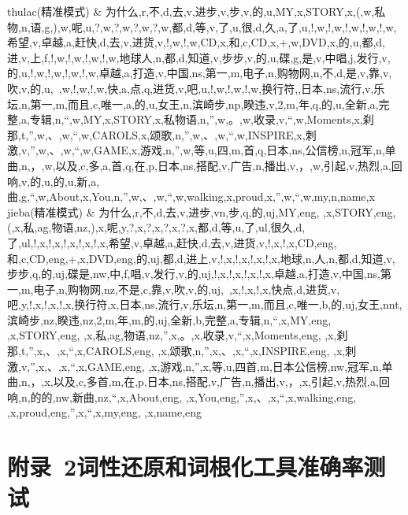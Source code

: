 \begin{center}
\begin{longtabu}
thulac\newline (精准模式) & 为什么,r,不,d,去,v,进步,v,步,v,的,u,MY,x,STORY,x,(,w,私物,n,语,g,),w,呢,u,?,w,?,w,?,w,?,w,都,d,等,v,了,u,很,d,久,a,了,u,!,w,!,w,!,w,!,w,!,w,希望,v,卓越,a,赶快,d,去,v,进货,v,!,w,!,w,CD,x,和,c,CD,x,+,w,DVD,x,的,u,都,d,进,v,上,f,!,w,!,w,!,w,!,w,地球人,n,都,d,知道,v,步步,v,的,u,碟,g,是,v,中唱,j,发行,v,的,u,!,w,!,w,!,w,!,w,卓越,a,打造,v,中国,ns,第一,m,电子,n,购物网,n,不,d,是,v,靠,v,吹,v,的,u,~,w,!,w,!,w,快,a,点,q,进货,v,吧,u,!,w,!,w,!,w,换行符,,日本,ns,流行,v,乐坛,n,第一,m,而且,c,唯一,a,的,u,女王,n,滨崎步,np,睽违,v,2,m,年,q,的,u,全新,a,完整,a,专辑,n,“,w,MY,x,STORY,x,私物语,n,”,w,。,w,收录,v,“,w,Moments,x,刹那,t,”,w,、,w,“,w,CAROLS,x,颂歌,n,”,w,、,w,“,w,INSPIRE,x,刺激,v,”,w,、,w,“,w,GAME,x,游戏,n,”,w,等,u,四,m,首,q,日本,ns,公信榜,n,冠军,n,单曲,n,，,w,以及,c,多,a,首,q,在,p,日本,ns,搭配,v,广告,n,播出,v,，,w,引起,v,热烈,a,回响,v,的,u,的,u,新,a,曲,g,“,w,About,x,You,n,”,w,、,w,“,w,walking,x,proud,x,”,w,“,w,my,n,name,x\\
jieba\newline (精准模式) & 为什么,r,不,d,去,v,进步,vn,步,q,的,uj,MY,eng, ,x,STORY,eng,(,x,私,ag,物语,nz,),x,呢,y,?,x,?,x,?,x,?,x,都,d,等,u,了,ul,很久,d,了,ul,!,x,!,x,!,x,!,x,!,x,希望,v,卓越,a,赶快,d,去,v,进货,v,!,x,!,x,CD,eng,和,c,CD,eng,+,x,DVD,eng,的,uj,都,d,进上,v,!,x,!,x,!,x,!,x,地球,n,人,n,都,d,知道,v,步步,q,的,uj,碟是,nw,中,f,唱,v,发行,v,的,uj,!,x,!,x,!,x,!,x,卓越,a,打造,v,中国,ns,第一,m,电子,n,购物网,nz,不是,c,靠,v,吹,v,的,uj,~,x,!,x,!,x,快点,d,进货,v,吧,y,!,x,!,x,!,x,换行符,x,日本,ns,流行,v,乐坛,n,第一,m,而且,c,唯一,b,的,uj,女王,nnt,滨崎步,nz,睽违,nz,2,m,年,m,的,uj,全新,b,完整,a,专辑,n,“,x,MY,eng, ,x,STORY,eng, ,x,私,ag,物语,nz,”,x,。,x,收录,v,“,x,Moments,eng, ,x,刹那,t,”,x,、,x,“,x,CAROLS,eng, ,x,颂歌,n,”,x,、,x,“,x,INSPIRE,eng, ,x,刺激,v,”,x,、,x,“,x,GAME,eng, ,x,游戏,n,”,x,等,u,四首,m,日本公信榜,nw,冠军,n,单曲,n,，,x,以及,c,多首,m,在,p,日本,ns,搭配,v,广告,n,播出,v,，,x,引起,v,热烈,a,回响,n,的的,nw,新曲,nz,“,x,About,eng, ,x,You,eng,”,x,、,x,“,x,walking,eng, ,x,proud,eng,”,x,“,x,my,eng, ,x,name,eng\\
\hline
\end{longtabu}
\end{center}
\section*{附录~2\quad	词性还原和词根化工具准确率测试} \label{appendix:lemmacompare}

